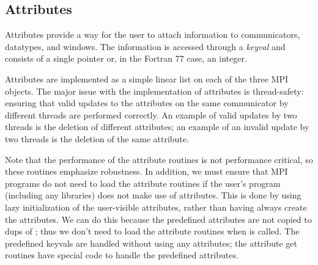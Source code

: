 \documentclass{article}
\begin{document}

\subsection{Attributes}
\label{sec:attr}

Attributes provide a way for the user to attach information to
communicators, datatypes, and windows.  The information is accessed
through a \emph{keyval} and consists of a single pointer or, in the
Fortran 77 case, an integer.

Attributes are implemented as a simple linear list on each of the
three MPI objects.  The major issue with the implementation of attributes
is thread-safety: ensuring that valid updates to the attributes on the
same communicator by different threads are performed correctly.  An
example of valid updates by two threads is the deletion of different
attributes; an example of an invalid update by two threads is the
deletion of the same attribute.


Note that the performance of the attribute routines is not performance
critical, so these routines emphasize robustness.  In addition, we
must ensure that MPI programs do not need to load the
attribute routines if the user's program (including any libraries)
does not make use of attributes.  This is done by using lazy
initialization of the user-visible attributes, rather than having
 always create the attributes.  
We can do this because
the predefined attributes are not copied to dups of
; thus we don't need to load the attribute
routines when  is called.
The predefined keyvals are handled without using any attributes; the
attribute get routines have special code to handle the predefined attributes.
\end{document}
